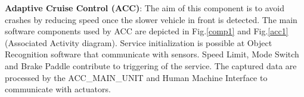 \documentclass[3p,times,procedia,authoryear,round]{elsarticle}
\begin{document}
\textbf{Adaptive Cruise Control (ACC)}: The aim of this component is to avoid crashes by reducing speed once the slower vehicle in front is detected. The main software components used by ACC are depicted in Fig.\ref{comp1}  and Fig.\ref{acc1}(Associated Activity diagram). Service initialization is possible at Object Recognition software that communicate with sensors. Speed Limit, Mode Switch and Brake Paddle contribute to triggering of the service. The captured data are processed by the ACC\_MAIN\_UNIT and Human Machine Interface to communicate with actuators. 


  	\lstset{
  		basicstyle=\ttfamily\scriptsize,
  		numbers=left,
  		numberstyle=\scriptsize,
  		numbersep=3pt,
  		caption=ACC PRISM code fragment,
  		frame=single,
  		captionpos=b,
  		label=sourcecode,
  		tabsize=2,
           linewidth=14.5cm
  	}
  	\tiny
  	
\end{document}
